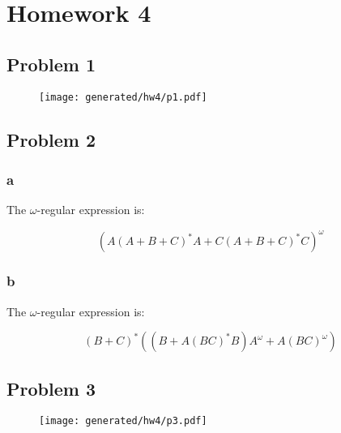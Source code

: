 \chapter{Homework 4}

\section{Problem 1}

\begin{figure}[H]
    \centering
    \texttt{[image: generated/hw4/p1.pdf]}
\end{figure}

\section{Problem 2}

\subsection{a}

The $\omega$-regular expression is:

$$
(A (A + B + C)^* A + C (A + B + C)^* C)^{\omega}
$$

\subsection{b}

The $\omega$-regular expression is:

$$
(B + C)^*((B + A(BC)^*B)A^{\omega} + A(BC)^{\omega})
$$

\section{Problem 3}

\begin{figure}[H]
    \centering
    \texttt{[image: generated/hw4/p3.pdf]}
\end{figure}
